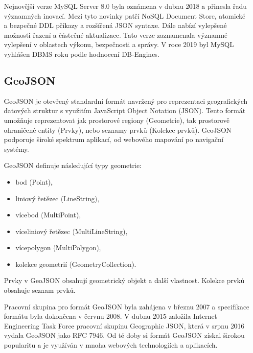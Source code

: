 Nejnovější verze MySQL Server 8.0 byla oznámena v dubnu 2018 a přinesla řadu významných inovací. Mezi tyto novinky patří NoSQL Document Store, atomické a bezpečné DDL příkazy a rozšířená JSON syntaxe. Dále nabízí vylepšené možnosti řazení a částečné aktualizace. Tato verze zaznamenala významné vylepšení v oblastech výkonu, bezpečnosti a správy. V roce 2019 byl MySQL vyhlášen DBMS roku podle hodnocení DB-Engines. \cite{MySQL}

\subsection{GeoJSON}
GeoJSON je otevřený standardní formát navržený pro reprezentaci geografických datových struktur s využitím JavaScript Object Notation (JSON). Tento formát umožňuje reprezentovat jak prostorové regiony (Geometrie), tak prostorově ohraničené entity (Prvky), nebo seznamy prvků (Kolekce prvků). GeoJSON podporuje široké spektrum aplikací, od webového mapování po navigační systémy.

GeoJSON definuje následující typy geometrie: 
\begin{itemize}
    \item bod (Point),
    \item liniový řetězec (LineString),
    \item vícebod (MultiPoint),
    \item víceliniový řetězec (MultiLineString),
    \item vícepolygon (MultiPolygon),
    \item kolekce geometrií (GeometryCollection).
\end{itemize}

Prvky v GeoJSON obsahují geometrický objekt a další vlastnost. Kolekce prvků obsahuje seznam prvků.

Pracovní skupina pro formát GeoJSON byla zahájena v březnu 2007 a specifikace formátu byla dokončena v červnu 2008. V dubnu 2015 založila Internet Engineering Task Force pracovní skupinu Geographic JSON, která v srpnu 2016 vydala GeoJSON jako RFC 7946. Od té doby si formát GeoJSON získal širokou popularitu a je využíván v mnoha webových technologiích a aplikacích. \cite{butler_geojson_2016}
